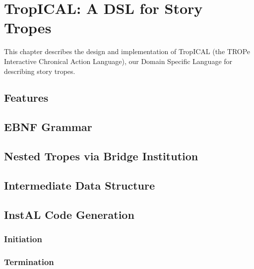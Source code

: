 
\chapter{TropICAL: A DSL for Story Tropes}

This chapter describes the design and implementation of TropICAL (the TROPe
Interactive Chronical Action Language), our Domain Specific Language for
describing story tropes.

\section{Features}

\section{EBNF Grammar}

\section{Nested Tropes via Bridge Institution}

\section{Intermediate Data Structure}

\section{InstAL Code Generation}

\subsection{Initiation}

\subsection{Termination}

